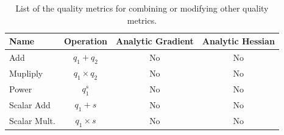 \begin{table}[!hp]
\begin{center}
\begin{tabular}{|l|c|c|c|}
\hline
Name        & Operation        & Analytic Gradient & Analytic Hessian \\
\hline
Add         & $q_1 + q_2$      & No                & No               \\
Mupliply    & $q_1 \times q_2$ & No                & No               \\
Power       & $q_1^s$          & No                & No               \\
Scalar Add  & $q_1 + s$        & No                & No               \\
Scalar Mult.& $q_1 \times s$   & No                & No               \\
\hline
\end{tabular}
\caption{List of the quality metrics for combining or modifying other quality metrics.}
\label{Composite Metrics}
\end{center}

\end{table}


